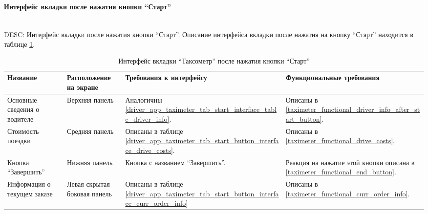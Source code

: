       \paragraph{Интерфейс вкладки после нажатия кнопки “Старт”} \mbox{}\\ \label{driver_app_taximeter_tab_interface_start_button}
        DESC: Интерфейс вкладки после нажатия кнопки “Старт”. 
        Описание интерфейса вкладки после нажатия на кнопку “Старт” находится в таблице \ref{driver_app_taximeter_tab_start_button_interface_table}.\\

        \begin{table}[h]
          \begin{center}
          \caption {Интерфейс вкладки “Таксометр” после нажатия кнопки “Старт”}
          \label{driver_app_taximeter_tab_start_button_interface_table}
          \setlength{\extrarowheight}{2mm}
            \begin{tabular}{|p{4cm}|p{3cm}|p{4cm}|p{4cm}|}
              \hline     \textbf{Название}&\textbf{Расположение на экране}&\textbf{Требования к интерфейсу}&\textbf{Функциональные требования} \\ [2mm]

              \hline   Основные сведения о водителе & Верхняя панель & Аналогичны \ref{driver_app_taximeter_tab_start_interface_table_driver_info}. & Описаны в \ref{taximeter_functional_driver_info_after_start_button}. \\ [2mm]

              \hline   Стоимость поездки & Средняя панель & Описаны в таблице \ref{driver_app_taximeter_tab_start_button_interface_drive_costs}. & Описаны в \ref{taximeter_functional_drive_costs}. \\ [2mm]%

              \hline   Кнопка “Завершить” & Нижняя панель & Кнопка с названием “Завершить”. & Реакция на нажатие этой кнопки описана в \ref{taximeter_functional_end_button}. \\ [2mm]%

              \hline   Информация о текущем заказе & Левая скрытая боковая панель & Описаны в таблице \ref{driver_app_taximeter_tab_start_button_interface_curr_order_info} & Описаны в \ref{taximeter_functional_curr_order_info}. \\ [2mm]%

              \hline
            \end{tabular}
          \end{center}
        \end{table}

